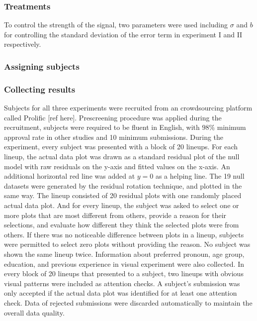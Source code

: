 \documentclass[]{interact}
\theoremstyle{plain}%
\theoremstyle{definition}
\theoremstyle{remark}
\begin{document}
\hypertarget{treatments}{%
\subsubsection{Treatments}\label{treatments}}

To control the strength of the signal, two parameters were used
including \(\sigma\) and \(b\) for controlling the standard deviation of
the error term in experiment I and II respectively.

\hypertarget{assigning-subjects}{%
\subsubsection{Assigning subjects}\label{assigning-subjects}}

\hypertarget{collecting-results}{%
\subsubsection{Collecting results}\label{collecting-results}}

Subjects for all three experiments were recruited from an crowdsourcing
platform called Prolific {[}ref here{]}. Prescreening procedure was
applied during the recruitment, subjects were required to be fluent in
English, with \(98\%\) minimum approval rate in other studies and 10
minimum submissions. During the experiment, every subject was presented
with a block of 20 lineups. For each lineup, the actual data plot was
drawn as a standard residual plot of the null model with raw residuals
on the y-axis and fitted values on the x-axis. An additional horizontal
red line was added at \(y = 0\) as a helping line. The 19 null datasets
were generated by the residual rotation technique, and plotted in the
same way. The lineup consisted of 20 residual plots with one randomly
placed actual data plot. And for every lineup, the subject was asked to
select one or more plots that are most different from others, provide a
reason for their selections, and evaluate how different they think the
selected plots were from others. If there was no noticeable difference
between plots in a lineup, subjects were permitted to select zero plots
without providing the reason. No subject was shown the same lineup
twice. Information about preferred pronoun, age group, education, and
previous experience in visual experiment were also collected. In every
block of 20 lineups that presented to a subject, two lineups with
obvious visual patterns were included as attention checks. A subject's
submission was only accepted if the actual data plot was identified for
at least one attention check. Data of rejected submissions were
discarded automatically to maintain the overall data quality.
\end{document}

